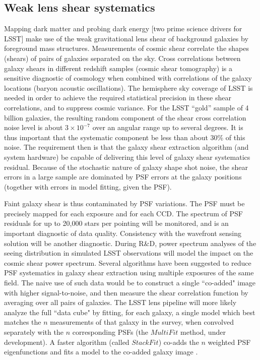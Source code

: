 \documentclass[SE,toc]{lsstdoc}
\begin{document}
\subsection{Weak lens shear systematics}

Mapping dark matter and probing dark energy [two prime science drivers for LSST] make use of the weak gravitational lens shear of background galaxies by foreground mass structures. Measurements of cosmic shear correlate the shapes (shears) of pairs of galaxies separated on the sky.  Cross correlations between galaxy shears in different redshift samples (cosmic shear tomography) is a sensitive diagnostic of cosmology when combined with correlations of the galaxy locations (baryon acoustic oscillations). The hemisphere sky coverage of LSST is needed in order to achieve the required statistical precision in these shear correlations, and to suppress cosmic variance.  For the LSST ``gold'' sample of 4 billion galaxies, the resulting random component of the shear cross correlation noise level is about $3\times10^{-7}$ over an angular range up to several degrees.  It is thus important that the systematic component be less than about 30\% of this noise.  The requirement then is that the galaxy shear extraction algorithm (and system hardware) be capable of delivering this level of galaxy shear systematics residual.  Because of the stochastic nature of galaxy shape shot noise, the shear errors in a large sample are dominated by PSF errors at the galaxy positions (together with errors in model fitting, given the PSF).

Faint galaxy shear is thus contaminated by PSF variations. The PSF must be precisely mapped for each exposure and for each CCD. The spectrum of PSF residuals for up to 20,000 stars per pointing will be monitored, and is an important diagnostic of data quality. Consistency with the wavefront sensing solution will be another diagnostic.  During R\&D, power spectrum analyses of the seeing distribution in simulated LSST observations will model the impact on the cosmic shear power spectrum.  Several algorithms have been suggested to reduce PSF systematics in galaxy shear extraction using multiple exposures of the same field.  The naive use of such data would be to construct a single ``co-added" image with higher signal-to-noise, and then measure the shear correlation function by averaging over all pairs of galaxies.  The LSST lens pipeline will more likely analyze the full ``data cube" by fitting, for each galaxy, a single model which best matches the $n$ measurements of that galaxy in the survey, when convolved separately with the $n$ corresponding PSFs (the $MultiFit$ method, under development). A faster algorithm (called $StackFit$) co-adds the $n$ weighted PSF eigenfunctions and fits a model to the co-added galaxy image \citep{2011PASP..123..596J}.
\end{document}
